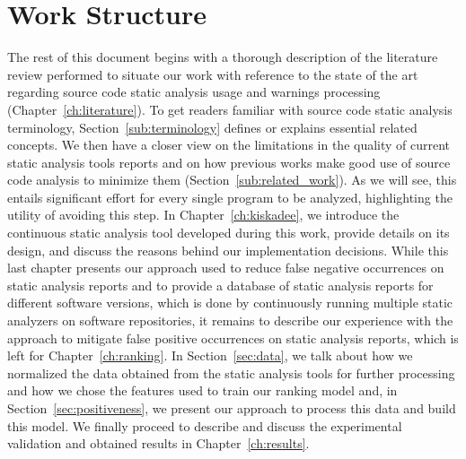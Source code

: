 \section{Work Structure}
\label{sec:structure}

The rest of this document begins with a thorough description of the literature
review performed to situate our work with reference to the state of the art
regarding source code static analysis usage and warnings processing
(Chapter~\ref{ch:literature}). To get readers familiar with source code static analysis
terminology, Section~\ref{sub:terminology} defines or explains essential related concepts. We
then have a closer view on the limitations in the quality of current static
analysis tools reports and on how previous works make good use of source code
analysis to minimize them (Section~\ref{sub:related_work}). As we will see, this entails
significant effort for every single program to be analyzed, highlighting the
utility of avoiding this step.  In Chapter~\ref{ch:kiskadee}, we introduce the continuous
static analysis tool developed during this work, provide details on its design,
and discuss the reasons behind our implementation decisions. While this last
chapter presents our approach used to reduce false negative occurrences on
static analysis reports and to provide a database of static analysis reports for
different software versions, which is done by continuously running multiple
static analyzers on software repositories, it remains to describe our
experience with the approach to mitigate false positive occurrences on static
analysis reports, which is left for Chapter~\ref{ch:ranking}. In Section~\ref{sec:data},
we talk about how we normalized the data obtained from the static analysis
tools for further processing and how we chose the features used to train our
ranking model and, in Section~\ref{sec:positiveness}, we present our approach to
process this data and build this model. We finally proceed to describe and
discuss the experimental validation and obtained results in
Chapter~\ref{ch:results}.
